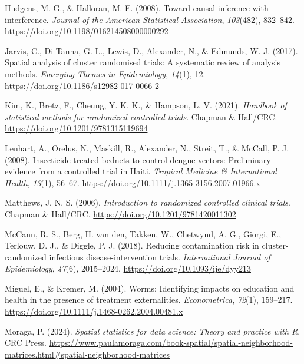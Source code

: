 \documentclass[
  12pt,
  prelim]{bios-prelim}
\newlength{\cslhangindent}
\newenvironment{CSLReferences}[2] %
 {\begin{list}{}{%
  \setlength{\itemindent}{0pt}
  \setlength{\leftmargin}{0pt}
  \setlength{\parsep}{0pt}
  \ifodd #1
   \setlength{\leftmargin}{\cslhangindent}
   \setlength{\itemindent}{-1\cslhangindent}
  \fi
  \setlength{\itemsep}{#2\baselineskip}}}
 {\end{list}}
\begin{document}
\begin{CSLReferences}{1}{0}
Hudgens, M. G., \& Halloran, M. E. (2008). Toward causal inference with
interference. \emph{Journal of the American Statistical Association},
\emph{103}(482), 832--842.
\url{https://doi.org/10.1198/016214508000000292}

Jarvis, C., Di Tanna, G. L., Lewis, D., Alexander, N., \& Edmunds, W. J.
(2017). Spatial analysis of cluster randomised trials: A systematic
review of analysis methods. \emph{Emerging Themes in Epidemiology},
\emph{14}(1), 12. \url{https://doi.org/10.1186/s12982-017-0066-2}

Kim, K., Bretz, F., Cheung, Y. K. K., \& Hampson, L. V. (2021).
\emph{Handbook of statistical methods for randomized controlled trials}.
Chapman \& Hall/CRC. \url{https://doi.org/10.1201/9781315119694}

Lenhart, A., Orelus, N., Maskill, R., Alexander, N., Streit, T., \&
McCall, P. J. (2008). Insecticide‐treated bednets to control dengue
vectors: Preliminary evidence from a controlled trial in {Haiti}.
\emph{Tropical Medicine \& International Health}, \emph{13}(1), 56--67.
\url{https://doi.org/10.1111/j.1365-3156.2007.01966.x}

Matthews, J. N. S. (2006). \emph{Introduction to randomized controlled
clinical trials}. Chapman \& Hall/CRC.
\url{https://doi.org/10.1201/9781420011302}

McCann, R. S., Berg, H. van den, Takken, W., Chetwynd, A. G., Giorgi,
E., Terlouw, D. J., \& Diggle, P. J. (2018). Reducing contamination risk
in cluster-randomized infectious disease-intervention trials.
\emph{International Journal of Epidemiology}, \emph{47}(6), 2015--2024.
\url{https://doi.org/10.1093/ije/dyy213}

Miguel, E., \& Kremer, M. (2004). Worms: Identifying impacts on
education and health in the presence of treatment externalities.
\emph{Econometrica}, \emph{72}(1), 159--217.
\url{https://doi.org/10.1111/j.1468-0262.2004.00481.x}

Moraga, P. (2024). \emph{Spatial statistics for data science: Theory and
practice with {R}}. CRC Press.
\url{https://www.paulamoraga.com/book-spatial/spatial-neighborhood-matrices.html\#spatial-neighborhood-matrices}


\end{CSLReferences}
\end{document}

